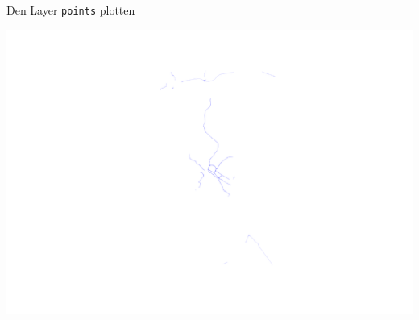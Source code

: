 \documentclass[ignorenonframetext,]{beamer}
\newenvironment{Shaded}{\begin{snugshade}}{\end{snugshade}}
\newcommand{\DataTypeTok}[1]{\textcolor[rgb]{0.74,0.68,0.62}{\underline{#1}}}
\newcommand{\DecValTok}[1]{\textcolor[rgb]{0.27,0.67,0.26}{#1}}
\newcommand{\KeywordTok}[1]{\textcolor[rgb]{0.26,0.66,0.93}{\textbf{#1}}}
\newcommand{\NormalTok}[1]{\textcolor[rgb]{0.74,0.68,0.62}{#1}}
\newcommand{\OperatorTok}[1]{\textcolor[rgb]{0.74,0.68,0.62}{#1}}
\begin{document}
\begin{frame}[fragile]{Den Layer \texttt{points} plotten}
\protect\hypertarget{den-layer-points-plotten}{}

\begin{Shaded}
\end{Shaded}

\includegraphics{B3_osm_mainapi_files/figure-beamer/unnamed-chunk-33-1.pdf}

\end{frame}
\end{document}
